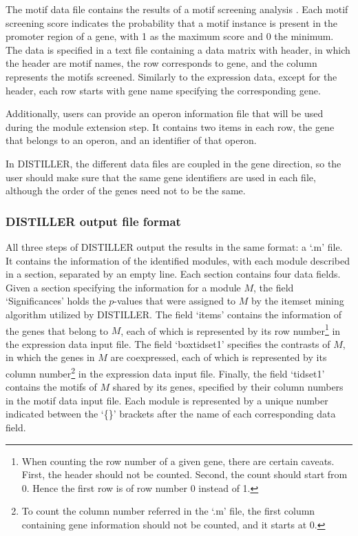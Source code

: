 The motif data file contains the results of a motif screening analysis 
\cite{Hertzberg2005}. 
%
Each motif screening score indicates the probability that a motif instance is
present in the promoter region of a gene, with 1 as the maximum score and 0 the
minimum.
%
The data is specified in a text file containing a data matrix with header, in
which the header are motif names, the row corresponds to gene, and the column
represents the motifs screened.  Similarly to the expression data, except for
the header, each row starts with gene name specifying the corresponding gene.

Additionally, users can provide an operon information file that will be used
during the module extension step.  It contains two items in each row, the gene
that belongs to an operon, and an identifier of that operon.

In DISTILLER, the different data files are coupled in the gene direction, so the
user should make sure that the same gene identifiers are used in each file,
although the order of the genes need not to be the same.


\subsubsection{DISTILLER output file format}\label{sec:distiller-outfile-format}
All three steps of DISTILLER output the results in the same format: a `.m' file.
%
It contains the information of the identified modules, with each module
described in a section, separated by an empty line.  
%
Each section contains four data fields.  Given a section specifying the
information for a module $M$, the field `Significances' holds the $p$-values
that were assigned to $M$ by the itemset mining algorithm \cite{Zaki} utilized
by DISTILLER.  The field `items' contains the information of the genes that
belong to $M$, each of which is represented by its row number\footnote{When
  counting the row number of a given gene, there are certain caveats. First, the
  header should not be counted.  Second, the count should start from 0. Hence
  the first row is of row number 0 instead of 1.} in the expression data input
file. The field `boxtidset1' specifies the contrasts of $M$, in which the genes
in $M$ are coexpressed, each of which is represented by its column
number\footnote{To count the column number referred in the `.m' file, the first
  column containing gene information should not be counted, and it starts at 0.}
in the expression data input file. Finally, the field `tidset1' contains the
motifs of $M$ shared by its genes, specified by their column numbers in the
motif data input file.  
%
Each module is represented by a unique number indicated between the `\{\}'
brackets after the name of each corresponding data field.

